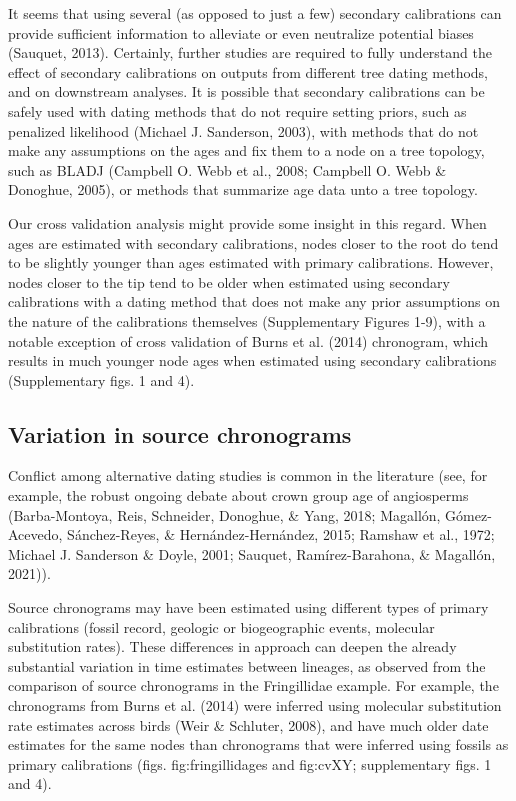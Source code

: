 \documentclass[
  man]{apa6}
\begin{document}
It seems that using several (as opposed to just a few) secondary calibrations can provide sufficient information to alleviate or even neutralize potential biases (Sauquet, 2013).
Certainly, further studies are required to fully understand the effect of secondary calibrations on outputs from different tree dating methods, and on downstream analyses. It is possible that secondary calibrations can be safely used with dating methods that do not require setting priors, such as penalized likelihood (Michael J. Sanderson, 2003), with methods that do not make any assumptions on the ages and fix them to a node on a tree topology, such as BLADJ (Campbell O. Webb et al., 2008; Campbell O. Webb \& Donoghue, 2005), or methods that summarize age data unto a tree topology.

Our cross validation analysis might provide some insight in this regard. When ages are estimated with secondary calibrations, nodes closer to the root do tend to be slightly younger than ages estimated with primary calibrations. However, nodes closer to the tip tend to be older when estimated using secondary calibrations with a dating method that does not make any prior assumptions on the nature of the calibrations themselves (Supplementary Figures 1-9), with a notable exception of cross validation of Burns et al. (2014) chronogram, which results in much younger node ages when estimated using secondary calibrations (Supplementary figs. 1 and 4).

\hypertarget{variation-in-source-chronograms}{%
\subsection{Variation in source chronograms}\label{variation-in-source-chronograms}}

Conflict among alternative dating studies is common in the literature
(see, for example, the robust ongoing debate about crown group age of angiosperms (Barba-Montoya, Reis, Schneider, Donoghue, \& Yang, 2018; Magallón, Gómez-Acevedo, Sánchez-Reyes, \& Hernández-Hernández, 2015; Ramshaw et al., 1972; Michael J. Sanderson \& Doyle, 2001; Sauquet, Ramírez-Barahona, \& Magallón, 2021)).

Source chronograms may have been estimated using different types of primary calibrations (fossil record, geologic or biogeographic events, molecular substitution rates).
These differences in approach can deepen the already substantial variation in time estimates between lineages, as observed from the comparison of source chronograms in the Fringillidae example.
For example, the chronograms from Burns et al. (2014) were inferred using molecular substitution rate estimates across birds (Weir \& Schluter, 2008), and have much older date estimates for the same nodes than chronograms that were inferred using fossils as primary calibrations (figs. fig:fringillidages and fig:cvXY; supplementary figs. 1 and 4).
\end{document}
